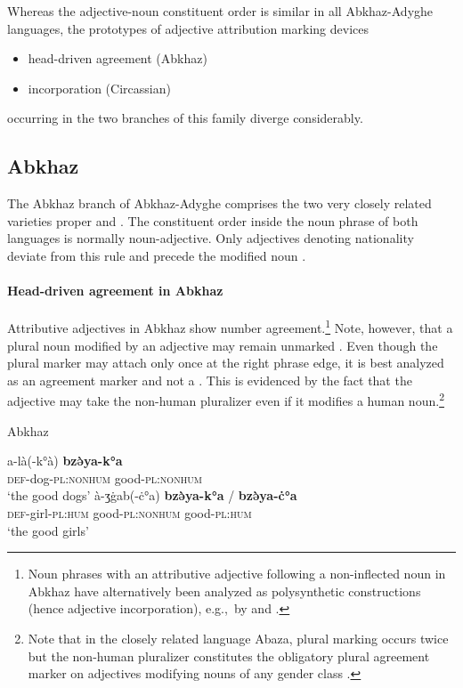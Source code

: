 Whereas the adjective-noun constituent order is similar in all Abkhaz-Adyghe languages, the prototypes of adjective attribution marking devices
\begin{itemize}
\item head\hyp{}driven agreement (Abkhaz)
\item incorporation (Circassian)
\end{itemize}
occurring in the two branches of this family diverge considerably.

\subsection{Abkhaz}
The Abkhaz branch of Abkhaz-Adyghe comprises the two very closely related varieties  proper and . The constituent order inside the noun phrase of both languages is normally noun-adjective. Only adjectives denoting nationality deviate from this rule and precede the modified noun \citep[222]{comrie1981}.

\paragraph*{Head\hyp{}driven agreement in Abkhaz}
Attributive adjectives in Abkhaz show number agreement.\footnote{Noun phrases with an attributive adjective following a non-inflected noun in Abkhaz have alternatively been analyzed as polysynthetic constructions (hence adjective incorporation), e.g.,~by \citet[123]{rijkhoff2002} and \citet{gil2005}.} Note, however, that a plural noun modified by an adjective may remain unmarked \citep[46]{hewitt1989a}. Even though the plural marker may attach only once at the right phrase edge, it is best analyzed as an agreement marker and not a . This is evidenced by the fact that the adjective may take the non-human pluralizer even if it modifies a human noun.\footnote{Note that in the closely related language Abaza, plural marking occurs twice but the non-human pluralizer constitutes the obligatory plural agreement marker on adjectives modifying nouns of any gender class \citep[100]{lomtatidze-etal1989}.}
\begin{exe}
\ex \rm{Abkhaz \citep{hewitt1989a}}
\begin{xlist}
\ex
\gll	a-là(-k°à) \textbf{bzə̀ya-k°a}\\
	\textsc{def}-dog-\textsc{pl:nonhum} good-\textsc{pl:nonhum}\\
\glt	‘the good dogs’
\ex	
\gll	à-ʒġab(-ċ°a) \textbf{bzə̀ya-k°a} / \textbf{bzə̀ya-ċ°a}\\
	\textsc{def}-girl-\textsc{pl:hum} good-\textsc{pl:nonhum} {} good-\textsc{pl:hum}\\
\glt	‘the good girls’
\end{xlist}
\end{exe}

